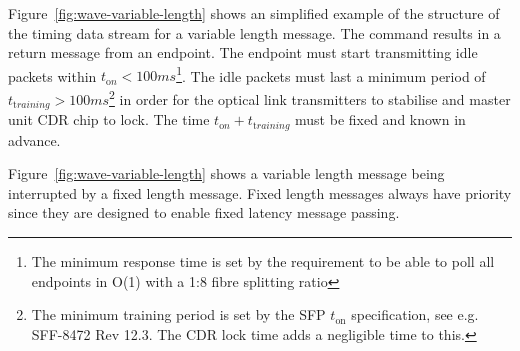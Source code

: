 \documentclass{dune}
\begin{document}
Figure~\ref{fig:wave-variable-length} shows an simplified example of the structure of the timing data stream for a variable length message. The command results in a return message from an endpoint. The endpoint must start transmitting idle packets within $t_{\mathrm on} < 100 ms$\footnote{The minimum response time is set by the requirement to be able to poll all endpoints in O(1) with a 1:8 fibre splitting ratio}. The idle packets must last a minimum period of $t_{\mathrm training} > 100 ms$\footnote{The minimum training period is set by the SFP $t_\mathrm{on}$ specification, see e.g. SFF-8472 Rev 12.3. The CDR lock time adds a negligible time to this.} in order for the optical link transmitters to stabilise and master unit CDR chip to lock. The time $t_{\mathrm on}  + t_{\mathrm training}$ must be fixed and known in advance.

Figure~\ref{fig:wave-variable-length} shows a variable length message being interrupted by a fixed length message. Fixed length messages always have priority since they are designed to enable fixed latency message passing.
\end{document}
